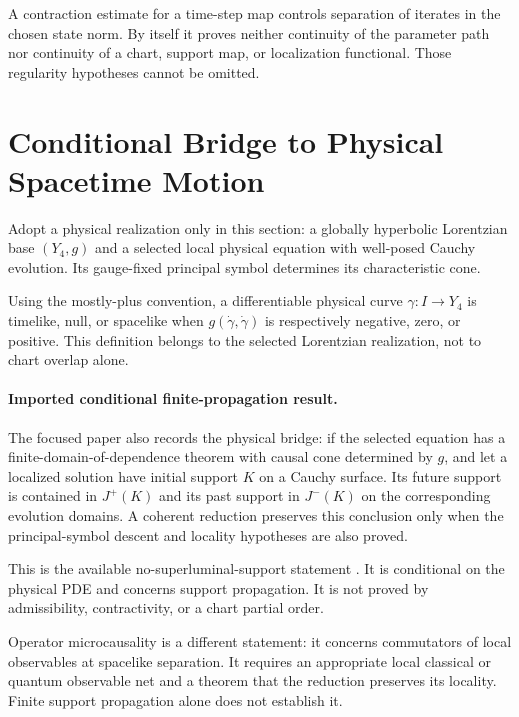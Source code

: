 \documentclass[11pt]{article}
\begin{document}
A contraction estimate for a time-step map controls separation of iterates in
the chosen state norm. By itself it proves neither continuity of the parameter
path nor continuity of a chart, support map, or localization functional.
Those regularity hypotheses cannot be omitted.

\section{Conditional Bridge to Physical Spacetime Motion}

Adopt a physical realization only in this section: a globally hyperbolic
Lorentzian base $(Y_4,g)$ and a selected local physical equation with
well-posed Cauchy evolution. Its gauge-fixed principal symbol determines its
characteristic cone.

\begin{definition}
Using the mostly-plus convention, a differentiable physical curve
$\gamma:I\to Y_4$ is timelike, null, or spacelike when
$g(\dot\gamma,\dot\gamma)$ is respectively negative, zero, or positive. This
definition belongs to the selected Lorentzian realization, not to chart
overlap alone.
\end{definition}

\paragraph{Imported conditional finite-propagation result.}
The focused paper also records the physical bridge: if the selected equation
has a finite-domain-of-dependence
theorem with causal cone determined by $g$, and let a localized solution have
initial support $K$ on a Cauchy surface. Its future support is contained in
$J^+(K)$ and its past support in $J^-(K)$ on the corresponding evolution
domains. A coherent reduction preserves this conclusion only when the
principal-symbol descent and locality hypotheses are also proved.

This is the available no-superluminal-support statement
\cite{BGP}. It is conditional on the physical PDE and concerns support
propagation. It is not proved by admissibility, contractivity, or a chart
partial order.

Operator microcausality is a different statement: it concerns commutators of
local observables at spacelike separation. It requires an appropriate local
classical or quantum observable net and a theorem that the reduction preserves
its locality. Finite support propagation alone does not establish it.
\end{document}
